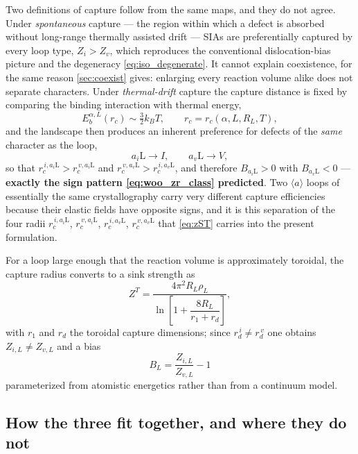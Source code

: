 \documentclass{article}
\newcommand{\aloop}{\ensuremath{\langle a\rangle}}
\newcommand{\aiL}{a_{i}\mathrm{L}}
\newcommand{\avL}{a_{v}\mathrm{L}}
\begin{document}
Two definitions of capture follow from the same maps, and they do not agree.
Under \emph{spontaneous} capture --- the region within which a defect is absorbed
without long-range thermally assisted drift --- SIAs are preferentially captured
by every loop type, $Z_i>Z_v$, which reproduces the conventional dislocation-bias
picture and the degeneracy \cref{eq:iso_degenerate}. It cannot explain
coexistence, for the same reason \cref{sec:coexist} gives: enlarging every
reaction volume alike does not separate characters. Under \emph{thermal-drift}
capture the capture distance is fixed by comparing the binding interaction with
thermal energy,
\begin{equation}
    E_b^{\alpha,L}(r_c)\sim\tfrac{3}{2}k_BT ,
    \qquad
    r_c = r_c(\alpha,L,R_L,T),
    \label{eq:thermal_capture}
\end{equation}
and the landscape then produces an inherent preference for defects of the
\emph{same} character as the loop,
\begin{equation}
\boxed{\;\aiL\rightarrow I,\qquad \avL\rightarrow V,\;}
\label{eq:march_same_type}
\end{equation}
so that $r_c^{\,i,\aiL}>r_c^{\,v,\aiL}$ and $r_c^{\,v,\avL}>r_c^{\,i,\avL}$, and
therefore $B_{\aiL}>0$ with $B_{\avL}<0$ --- \textbf{exactly the sign pattern
\cref{eq:woo_zr_class} predicted}. Two \aloop{} loops of essentially the same
crystallography carry very different capture efficiencies because their elastic
fields have opposite signs, and it is this separation of the four radii
$r_c^{\,i,\aiL}$, $r_c^{\,v,\aiL}$, $r_c^{\,i,\avL}$, $r_c^{\,v,\avL}$ that
\cref{eq:zST} carries into the present formulation.

For a loop large enough that the reaction volume is approximately toroidal, the
capture radius converts to a sink strength as
\begin{equation}
    Z^{T}
    =\frac{4\pi^2 R_L\rho_L}
         {\ln\!\left[1+\dfrac{8R_L}{r_1+r_d}\right]},
    \label{eq:toroidal_sink}
\end{equation}
with $r_1$ and $r_d$ the toroidal capture dimensions; since
$r_d^{\,i}\neq r_d^{\,v}$ one obtains $Z_{i,L}\neq Z_{v,L}$ and a bias
\begin{equation}
    B_L = \frac{Z_{i,L}}{Z_{v,L}}-1
    \label{eq:march_bias}
\end{equation}
parameterized from atomistic energetics rather than from a continuum model.

\subsection{How the three fit together, and where they do not}
\end{document}
